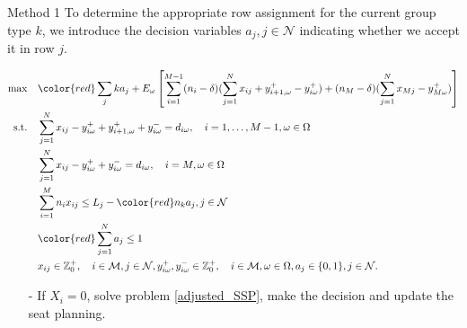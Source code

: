   \begin{frame}{Method 1}
    \scriptsize
    To determine the appropriate row assignment for the current group type $k$, we introduce the decision variables $a_j, j \in \mathcal{N}$ indicating whether we accept it in row $j$.
    
      \begin{tiny}
        \begin{equation}\label{adjusted_SSP}
        \begin{aligned}
        \max \quad & {\color{red}\sum_{j} k a_j} + E_{\omega}\left[\sum_{i=1}^{M-1} (n_i-\delta) (\sum_{j= 1}^{N} x_{ij} + y_{i+1,\omega}^{+} - y_{i \omega}^{+}) + (n_{M}-\delta) (\sum_{j= 1}^{N} x_{Mj} - y_{M \omega}^{+})\right] \\
        \text {s.t.} \quad & \sum_{j= 1}^{N} x_{ij}-y_{i \omega}^{+}+
        y_{i+1, \omega}^{+} + y_{i \omega}^{-}=d_{i \omega}, \quad i = 1,\ldots,M-1, \omega \in \Omega \\
        & \sum_{j= 1}^{N} x_{ij} -y_{i \omega}^{+}+y_{i \omega}^{-}=d_{i \omega}, \quad i = M, \omega \in \Omega \\
        & \sum_{i=1}^{M} n_{i} x_{ij} \leq L_j - {\color{red}n_k a_j}, j \in \mathcal{N} \\
        & {\color{red}\sum_{j=1}^{N} a_j \leq 1} \\
        & x_{ij} \in \mathbb{Z}_{0}^{+}, \quad i \in \mathcal{M}, j \in \mathcal{N}, y_{i \omega}^{+}, y_{i \omega}^{-} \in \mathbb{Z}_{0}^{+}, \quad i \in \mathcal{M}, \omega \in \Omega,  a_j \in \{0,1\}, j \in \mathcal{N}.
        \end{aligned}
      \end{equation}
    \end{tiny}
    \begin{itemize}      
      \item[-] If $X_i = 0$, solve problem \eqref{adjusted_SSP}, make the decision and update the seat planning.
    \end{itemize}
  \end{frame}

      
      
